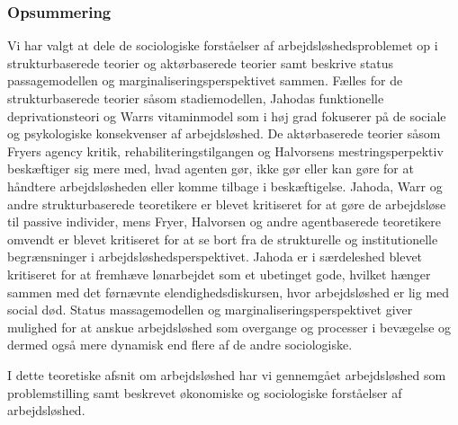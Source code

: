 
\subsubsection{Opsummering}

Vi har valgt at dele de sociologiske forståelser af arbejdsløshedsproblemet op i strukturbaserede teorier og aktørbaserede teorier samt beskrive status passagemodellen og marginaliseringsperspektivet sammen. Fælles for de strukturbaserede teorier såsom stadiemodellen, Jahodas funktionelle deprivationsteori og Warrs vitaminmodel som i høj grad fokuserer på de sociale og psykologiske konsekvenser af arbejdsløshed. De aktørbaserede teorier såsom Fryers agency kritik, rehabiliteringstilgangen og Halvorsens mestringsperpektiv beskæftiger sig mere med, hvad agenten gør, ikke gør eller kan gøre for at håndtere arbejdsløsheden eller komme tilbage i beskæftigelse. Jahoda, Warr og andre strukturbaserede teoretikere er blevet kritiseret for at gøre de arbejdsløse til passive individer, mens Fryer, Halvorsen og andre agentbaserede teoretikere omvendt er blevet kritiseret for at se bort fra de strukturelle og institutionelle begrænsninger i arbejdsløshedsperspektivet. Jahoda er i særdeleshed blevet kritiseret for at fremhæve lønarbejdet som et ubetinget gode, hvilket hænger sammen med det førnævnte elendighedsdiskursen, hvor arbejdsløshed er lig med social død. Status massagemodellen og marginaliseringsperspektivet giver mulighed for at anskue arbejdsløshed som overgange og processer i bevægelse og dermed også mere dynamisk end flere af de andre sociologiske.

I dette teoretiske afsnit om arbejdsløshed har vi gennemgået arbejdsløshed som problemstilling samt beskrevet økonomiske og sociologiske forståelser af arbejdsløshed.

